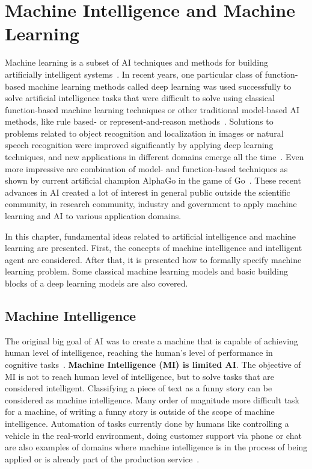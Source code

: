 \documentclass[english, 12pt, a4paper, elec, utf8, online]{aaltothesis}
\begin{document}
\clearpage
\section{Machine Intelligence and Machine Learning}\label{chapter:ml_theory}
Machine learning is a subset of AI techniques and methods for building artificially intelligent systems~\cite{Jung2018}. In recent years, one particular class of function-based machine learning methods called deep learning was used successfully to solve artificial intelligence tasks that were difficult to solve using classical function-based machine learning techniques or other traditional model-based AI methods, like rule based- or represent-and-reason methods~\cite{Goodfellow-et-al-2016, Darwiche17}. Solutions to problems related to object recognition and localization in images or natural speech recognition were improved significantly by applying deep learning techniques, and new applications in different domains emerge all the time~\cite{lecun2015deep}. Even more impressive are combination of model- and function-based techniques as shown by current artificial champion AlphaGo in the game of Go~\cite{Darwiche17, silver2017mastering}. These recent advances in AI created a lot of interest in general public outside the scientific community, in research community, industry and government to apply machine learning and AI to various application domains. 

In this chapter, fundamental ideas related to artificial intelligence and machine learning are presented. First, the concepts of machine intelligence and intelligent agent are considered. After that, it is presented how to formally specify machine learning problem. Some classical machine learning models and basic building blocks of a deep learning models are also covered.       
\subsection{Machine Intelligence}
The original big goal of AI was to create a machine that is capable of achieving human level of intelligence, reaching the human’s level of performance in cognitive tasks~\cite{Darwiche17}. \textbf{Machine Intelligence (MI) is limited AI}. The objective of MI is not to reach human level of intelligence, but to solve tasks that are considered intelligent. Classifying a piece of text as a funny story can be considered as machine intelligence. Many order of magnitude more difficult task for a machine, of writing a funny story is outside of the scope of machine intelligence. Automation of tasks currently done by humans like controlling a vehicle in the real-world environment, doing customer support via phone or chat are also examples of domains where machine intelligence is in the process of being applied or is already part of the production service~\cite{BojarskiCars16}. 
\end{document}
